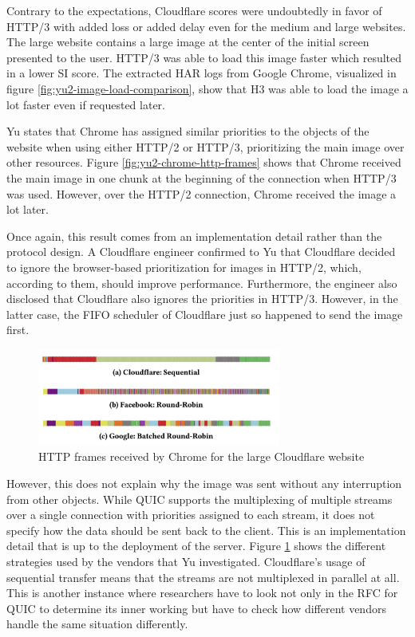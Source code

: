\documentclass[conference]{IEEEtran}
\begin{document}
Contrary to the expectations, Cloudflare scores were undoubtedly in favor of HTTP/3 with added loss or added delay even for the medium and large websites. The large website contains a large image at the center of the initial screen presented to the user. HTTP/3 was able to load this image faster which resulted in a lower SI score. The extracted HAR logs from Google Chrome, visualized in figure \ref{fig:yu2-image-load-comparison}, show that H3 was able to load the image a lot faster even if requested later. 

Yu states that Chrome has assigned similar priorities to the objects of the website when using either HTTP/2 or HTTP/3, prioritizing the main image over other resources. Figure \ref{fig:yu2-chrome-http-frames} shows that Chrome received the main image in one chunk at the beginning of the connection when HTTP/3 was used. However, over the HTTP/2 connection, Chrome received the image a lot later. 

Once again, this result comes from an implementation detail rather than the protocol design. A Cloudflare engineer confirmed to Yu that Cloudflare decided to ignore the browser-based prioritization for images in HTTP/2, which, according to them, should improve performance. Furthermore, the engineer also disclosed that Cloudflare also ignores the priorities in HTTP/3. However, in the latter case, the FIFO scheduler of Cloudflare just so happened to send the image first.

\begin{figure}[htbp]
  \begin{center}
  \includegraphics[width=8cm,keepaspectratio]{images/Yu2/HTTP3 multiplexing strategies.png}
  \caption{HTTP frames received by Chrome for the large Cloudflare website}
  \label{fig:yu2-multiplexing-strategies}
  \end{center}
\end{figure}

However, this does not explain why the image was sent without any interruption from other objects. While QUIC supports the multiplexing of multiple streams over a single connection with priorities assigned to each stream, it does not specify how the data should be sent back to the client. This is an implementation detail that is up to the deployment of the server. Figure \ref{fig:yu2-multiplexing-strategies} shows the different strategies used by the vendors that Yu investigated. Cloudflare's usage of sequential transfer means that the streams are not multiplexed in parallel at all. This is another instance where researchers have to look not only in the RFC for QUIC to determine its inner working but have to check how different vendors handle the same situation differently.
\end{document}
